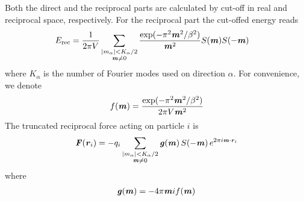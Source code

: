 \documentclass[aps,pre,preprint]{revtex4}
\renewcommand{\v}[1]{\textbf{\textit{#1}}}
\begin{document}
Both the direct and the reciprocal parts are calculated by cut-off in
real and reciprocal space, respectively. For the reciprocal part the
cut-offed energy reads
\begin{align}
  E_{\textrm{rec}} & =
  \frac1{2\pi V}
  \sum_{
    \begin{subarray}{c}
      \vert m_\alpha\vert < K_\alpha/2\\
      \v m\neq 0
    \end{subarray}}
  \frac{\exp(-\pi^2\v m^2 / \beta^2)}{\v m^2} S(\v m) S(-\v m)   
\end{align}
where $K_\alpha$ is the number of Fourier modes used on direction
$\alpha$. For convenience, we denote
\begin{align}
  f(\v m) = \frac{\exp(-\pi^2 \v m^2 / \beta^2)}{2\pi V \v m^2}
\end{align}
The truncated reciprocal force acting on particle $i$ is
\begin{align}
  \v F(\v r_i) = - 
  q_i 
  \sum_{
    \begin{subarray}{c}
      \vert m_\alpha\vert < K_\alpha/2\\
      \v m\neq 0
    \end{subarray}}
  \v g(\v m) \,
  S(-\v m)\,
  e^{2\pi i\v m\cdot\v r_i}
\end{align}
where
\begin{align}
  \v g(\v m) = -4 \pi \v m i f(\v m)
\end{align}
\end{document}
